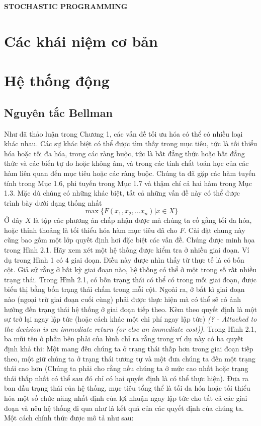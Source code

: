 \documentclass[12pt,a4paper]{report}
\begin{document}
	\begin{center}
		\textbf{STOCHASTIC PROGRAMMING}
	\end{center}
	\tableofcontents
	\chapter{Các khái niệm cơ bản}
	
	
	
	
	\chapter{Hệ thống động}
	\section{Nguyên tắc Bellman}
	Như đã thảo luận trong Chương 1, các vấn đề tối ưu hóa có thể có nhiều loại khác nhau. Các sự khác biệt có thể được tìm thấy trong mục tiêu, tức là tối thiểu hóa hoặc tối đa hóa, trong các ràng buộc, tức là bất đẳng thức hoặc bất đẳng thức và các biến tự do hoặc không âm, và trong các tính chất toán học của các hàm liên quan đến mục tiêu hoặc các ràng buộc. Chúng ta đã gặp các hàm tuyến tính trong Mục 1.6, phi tuyến trong Mục 1.7 và thậm chí cả hai hàm trong Mục 1.3. Mặc dù chúng có những khác biệt, tất cả những vấn đề này có thể được trình bày dưới dạng thống nhất
	\begin{equation}
		\max\{F(x_1,x_2,...x_n) | x \in X\} \nonumber
	\end{equation}
	Ở đây $X$ là tập các phương án chấp nhận được mà chúng ta cố gắng tối đa hóa, hoặc thỉnh thoảng là tối thiểu hóa hàm mục tiêu đã cho $F$.
	\newline
	Cài đặt chung này cũng bao gồm một lớp quyết định hơi đặc biệt
	các vấn đề. Chúng được minh họa trong Hình 2.1.
	\newline Hãy xem xét một hệ thống được kiểm tra ở nhiều giai đoạn. Ví dụ trong Hình 1 có 4 giai đoạn. Điều này được nhìn thấy từ thực tế là có bốn cột. Giả sử rằng ở bất kỳ giai đoạn nào, hệ thống có thể ở một trong số rất nhiều trạng thái. Trong Hình 2.1, có bốn trạng thái có thể có trong mỗi giai đoạn, được biểu thị bằng bốn trạng thái chấm trong mỗi cột. Ngoài ra, ở bất kì giai đoạn nào (ngoại trừ giai đoạn cuối cùng) phải được thực hiện mà có thể sẽ có ảnh hưởng đến trạng thái hệ thống ở giai đoạn tiếp theo. Kèm theo quyết định là một sự trở lại ngay lập tức (hoặc cách khác một chi phí ngay lập tức) \textit{(? - Attached to the decision is an immediate return (or else
	an immediate cost))}. Trong Hình 2.1, ba mũi tên ở phần bên phải của hình chỉ ra rằng trong ví dụ này có ba quyết định khả thi: Một mang đến chúng ta ở trạng thái thấp hơn trong giai đoạn tiếp theo, một giữ chúng ta ở trạng thái tương tự và một đưa chúng ta đến một trạng thái cao hơn (Chúng ta phải cho rằng nếu chúng ta ở mức cao nhất hoặc trạng thái thấp nhất có thể sau đó chỉ có hai quyết định là có thể thực hiện). Đưa ra ban đầu trạng thái của hệ thống, mục tiêu tổng thể là tối đa hóa hoặc tối thiểu hóa một số chức năng nhất định của lợi nhuận ngay lập tức cho tất cả các giai đoạn và nêu hệ thống đi qua như là kết quả của các quyết định của chúng ta. Một cách chính thức được mô tả như sau: 
\end{document}
